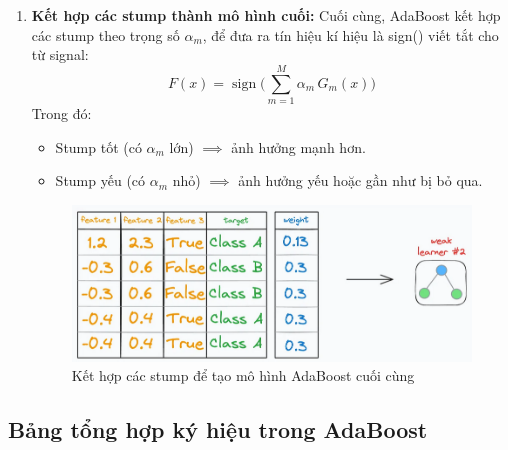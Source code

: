 \documentclass[11pt]{article}
\begin{document}
\begin{enumerate}
  \item \textbf{Kết hợp các stump thành mô hình cuối:}  
    Cuối cùng, AdaBoost kết hợp các stump theo trọng số \(\alpha_m\), để đưa ra tín hiệu kí hiệu là sign() viết tắt cho từ signal:  
    \[
    F(x) = \operatorname{sign}\Big(\sum_{m=1}^M \alpha_m \, G_m(x)\Big)
    \]  
    Trong đó:  
    \begin{itemize}
        \item Stump tốt (có \(\alpha_m\) lớn) \(\implies\) ảnh hưởng mạnh hơn.  
        \item Stump yếu (có \(\alpha_m\) nhỏ) \(\implies\) ảnh hưởng yếu hoặc gần như bị bỏ qua.  
    \end{itemize}

    \begin{figure}[H]
    \centering
    \includegraphics[width=0.7\linewidth]{images/ada_pipeline_8.png}
    \caption{Kết hợp các stump để tạo mô hình AdaBoost cuối cùng}
    \end{figure}
\end{enumerate}


\subsection*{Bảng tổng hợp ký hiệu trong AdaBoost}
\end{document}
